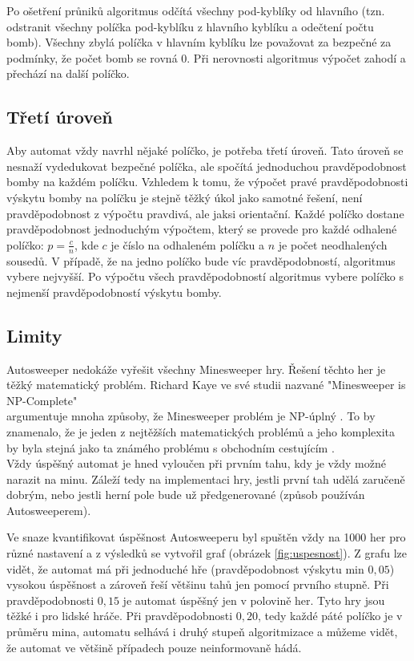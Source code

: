 Po ošetření průniků algoritmus odčítá všechny pod-kyblíky od hlavního (tzn. odstranit všechny políčka pod-kyblíku z hlavního
kyblíku a odečtení počtu bomb). Všechny zbylá políčka v hlavním kyblíku lze považovat za bezpečné za podmínky, že počet bomb se
rovná $0$. Při nerovnosti algoritmus výpočet zahodí a přechází na další políčko.


\subsection{Třetí úroveň}
Aby automat vždy navrhl nějaké políčko, je potřeba třetí úroveň. Tato úroveň se nesnaží vydedukovat bezpečné políčka, ale spočítá
jednoduchou pravděpodobnost bomby na každém políčku. Vzhledem k tomu, že výpočet pravé pravděpodobnosti výskytu bomby na políčku
je stejně těžký úkol jako samotné řešení, není pravděpodobnost z výpočtu pravdivá, ale jaksi orientační. Každé políčko dostane
pravděpodobnost jednoduchým výpočtem, který se provede pro každé odhalené políčko: $p = \frac{c}{n}$, kde $c$ je číslo na
odhaleném políčku a $n$ je počet neodhalených sousedů. V případě, že na jedno políčko bude víc pravděpodobností, algoritmus vybere
nejvyšší. Po výpočtu všech pravděpodobností algoritmus vybere políčko s nejmenší pravděpodobností výskytu bomby.


\subsection{Limity}
Autosweeper nedokáže vyřešit všechny Minesweeper hry. Řešení těchto her je těžký matematický problém. Richard Kaye ve své studii
nazvané "Minesweeper is NP-Complete" \\argumentuje mnoha způsoby, že Minesweeper problém je NP-úplný \autocite{Kaye2000}. To by
znamenalo, že je jeden z nejtěžších matematických problémů a jeho komplexita by byla stejná jako ta známého problému s obchodním
cestujícím \autocite{wiki_tsp}. \\Vždy úspěšný automat je hned vyloučen při prvním tahu, kdy je vždy možné narazit na minu. Záleží
tedy na implementaci hry, jestli první tah udělá zaručeně dobrým, nebo jestli herní pole bude už předgenerované (způsob používán
Autosweeperem).

Ve snaze kvantifikovat úspěšnost Autosweeperu byl spuštěn vždy na 1000 her pro různé nastavení a z výsledků se vytvořil graf
(obrázek \ref{fig:uspesnost}). Z grafu lze vidět, že automat má při jednoduché hře (pravděpodobnost výskytu min $0,05$) vysokou
úspěšnost a zároveň řeší většinu tahů jen pomocí prvního stupně. Při pravděpodobnosti $0,15$ je automat úspěšný jen v polovině
her. Tyto hry jsou těžké i pro lidské hráče. Při pravděpodobnosti $0,20$, tedy každé páté políčko je v průměru mina, automatu
selhává i druhý stupeň algoritmizace a můžeme vidět, že automat ve většině případech pouze neinformovaně hádá.


